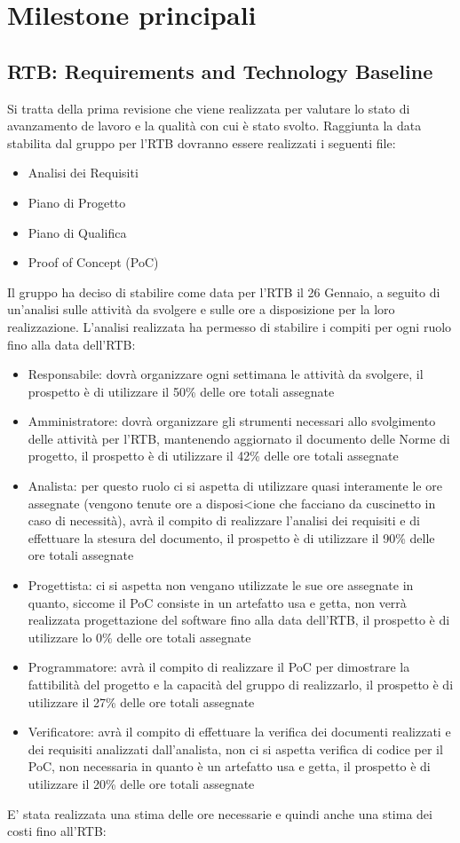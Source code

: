 \section{Milestone principali}
\label{sec:milestone_principali}
\subsection{RTB: Requirements and Technology Baseline}
Si tratta della prima revisione che viene realizzata per valutare lo stato di avanzamento de lavoro e la qualità con cui è stato svolto.
Raggiunta la data stabilita dal gruppo per l'RTB dovranno essere realizzati i seguenti file:

\begin{itemize}
\item Analisi dei Requisiti
\item Piano di Progetto
\item Piano di Qualifica
\item Proof of Concept (PoC)
\end{itemize}

Il gruppo ha deciso di stabilire come data per l'RTB il 26 Gennaio, a seguito di un'analisi sulle attività da svolgere e sulle ore a disposizione per la loro realizzazione.
L'analisi realizzata ha permesso di stabilire i compiti per ogni ruolo fino alla data dell'RTB:
\begin{itemize}
\item Responsabile: dovrà organizzare ogni settimana le attività da svolgere, il prospetto è di utilizzare il 50\% delle ore totali assegnate
\item Amministratore: dovrà organizzare gli strumenti necessari allo svolgimento delle attività per l'RTB, mantenendo aggiornato il documento delle Norme di progetto, il prospetto è di utilizzare il 42\% delle ore totali assegnate
\item Analista: per questo ruolo ci si aspetta di utilizzare quasi interamente le ore assegnate (vengono tenute ore a disposi<ione che facciano da cuscinetto in caso di necessità), avrà il compito di realizzare l'analisi dei requisiti e di effettuare la stesura del documento, il prospetto è di utilizzare il 90\% delle ore totali assegnate
\item Progettista: ci si aspetta non vengano utilizzate le sue ore assegnate in quanto, siccome il PoC consiste in un artefatto usa e getta, non verrà realizzata progettazione del software fino alla data dell'RTB, il prospetto è di utilizzare lo 0\% delle ore totali assegnate
\item Programmatore: avrà il compito di realizzare il PoC per dimostrare la fattibilità del progetto e la capacità del gruppo di realizzarlo, il prospetto è di utilizzare il 27\% delle ore totali assegnate
\item Verificatore: avrà il compito di effettuare la verifica dei documenti realizzati e dei requisiti analizzati dall'analista, non ci si aspetta verifica di codice per il PoC, non necessaria in quanto è un artefatto usa e getta, il prospetto è di utilizzare il 20\% delle ore totali assegnate
\end{itemize}
E' stata realizzata una stima delle ore necessarie e quindi anche una stima dei costi fino all'RTB:

